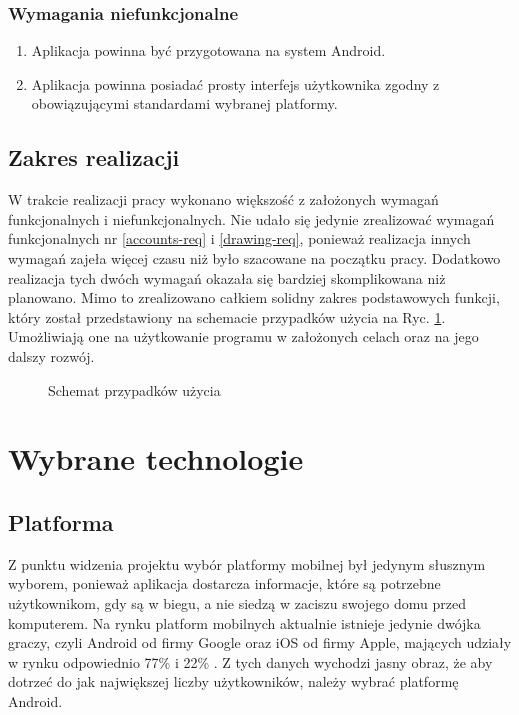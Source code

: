 \documentclass[polish,polish,a4paper,12pt]{article}
\let\sectioncmd\section
\renewcommand{\section}{\clearpage\sectioncmd}
\begin{document}
		\subsubsection{Wymagania niefunkcjonalne}

		\begin{enumerate}
			\item Aplikacja powinna być przygotowana na system Android.
			\item Aplikacja powinna posiadać prosty interfejs użytkownika zgodny z obowiązującymi standardami wybranej platformy.
		\end{enumerate}

	\subsection{Zakres realizacji}

	W trakcie realizacji pracy wykonano większość z założonych wymagań funkcjonalnych i niefunkcjonalnych. Nie udało się jedynie zrealizować wymagań funkcjonalnych nr \ref{accounts-req} i \ref{drawing-req}, ponieważ realizacja innych wymagań zajeła więcej czasu niż było szacowane na początku pracy. Dodatkowo realizacja tych dwóch wymagań okazała się bardziej skomplikowana niż planowano. Mimo to zrealizowano całkiem solidny zakres podstawowych funkcji, który został przedstawiony na schemacie przypadków użycia na Ryc. \ref{fig:usecasediagram}. Umożliwiają one na użytkowanie programu w założonych celach oraz na jego dalszy rozwój.

	\begin{figure}[H]
		\centering
		{\scriptsize
			
		}
		\caption{Schemat przypadków użycia}
		\label{fig:usecasediagram}
	\end{figure}

\section{Wybrane technologie}\label{technology}
	\subsection{Platforma}

	Z punktu widzenia projektu wybór platformy mobilnej był jedynym słusznym wyborem, ponieważ aplikacja dostarcza informacje, które są potrzebne użytkownikom, gdy są w biegu, a nie siedzą w zaciszu swojego domu przed komputerem. Na rynku platform mobilnych aktualnie istnieje jedynie dwójka graczy, czyli Android od firmy Google oraz iOS od firmy Apple, mających udziały w rynku odpowiednio 77\% i 22\% \cite{mobilemarketshare}. Z tych danych wychodzi jasny obraz, że aby dotrzeć do jak największej liczby użytkowników, należy wybrać platformę Android.
\end{document}
